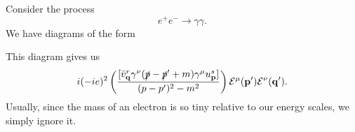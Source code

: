 \documentclass[a4paper]{article}
\begin{document}
\begin{eg}
  Consider the process
  \[
    e^+ e^- \to \gamma \gamma.
  \]
  We have diagrams of the form
  \begin{center}
  \end{center}
  This diagram gives us
  \[
    i(-ie)^2 \left(\frac{[\bar{v}^r_{\mathbf{q}} \gamma^\nu(\slashed p - \slashed p' + m) \gamma^{\mu} u^s_{\mathbf{p}}]}{(p - p')^2 - m^2}\right) \mathcal{E}^\mu(\mathbf{p}') \mathcal{E}^\nu(\mathbf{q}').
  \]
  Usually, since the mass of an electron is so tiny relative to our energy scales, we simply ignore it.
\end{eg}
\end{document}
